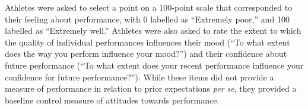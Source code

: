 \documentclass[12pt]{report}
\begin{document}
Athletes were asked to select a point on a 100-point scale that corresponded to their feeling about performance, with 0 labelled as  ``Extremely poor,'' and 100 labelled as  ``Extremely well.'' Athletes were also asked to rate the extent to which the quality of individual performances influences their mood (``To what extent does the way you perform influence your mood?'') and their confidence about future performance (``To what extent does your recent performance influence your confidence for future performance?'').  While these items did not provide a measure of performance in relation to prior expectations \textit{per se}, they provided a baseline control measure of attitudes towards performance.

\end{document}

